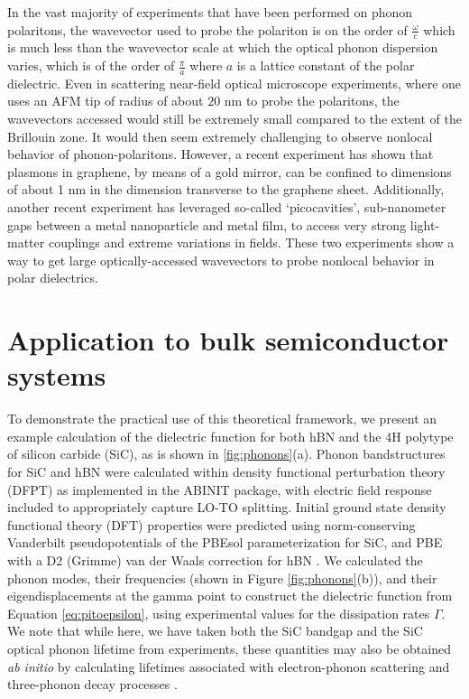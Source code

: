 \documentclass[aps,prb,twocolumn,
	groupedaddress,superscriptaddress,
	amsfonts,amssymb,amsmath,floatfix,
	citeautoscript]{revtex4-1}
\begin{document}
In the vast majority of experiments that have been performed on phonon polaritons, the wavevector used to probe the polariton is on the order of $\frac{\omega}{c}$ which is much less than the wavevector scale at which the optical phonon dispersion varies, which is of the order of $\frac{\pi}{a}$ where $a$ is a lattice constant of the polar dielectric.  Even in scattering near-field optical microscope experiments, where one uses an AFM tip of radius of about $20$ nm to probe the polaritons, the wavevectors accessed would still be extremely small compared to the extent of the Brillouin zone. It would then seem extremely challenging to observe nonlocal behavior of phonon-polaritons. However, a recent experiment \cite{iranzo2018probing} has shown that plasmons in graphene, by means of a gold mirror, can be confined to dimensions of about 1 nm in the dimension transverse to the graphene sheet. Additionally, another recent experiment \cite{benz2016single} has leveraged so-called `picocavities', sub-nanometer gaps between a metal nanoparticle and metal film, to access very strong light-matter couplings and extreme variations in fields. These two experiments show a way to get large optically-accessed wavevectors to probe nonlocal behavior in polar dielectrics.


\section{Application to bulk semiconductor systems}
To demonstrate the practical use of this theoretical framework, we present an example calculation of the dielectric function for both hBN and the 4H polytype of silicon carbide (SiC), as is shown in \ref{fig:phonons}(a). 
Phonon bandstructures for SiC and hBN were calculated within density functional perturbation
theory (DFPT) as implemented in the ABINIT package\cite{abinit1,abinit2,abinit3,Gonze1997dynamical,Hamann2005metric}, with electric field response included to appropriately capture LO-TO splitting. Initial ground state density functional theory (DFT) properties were predicted using norm-conserving Vanderbilt pseudopotentials of the PBEsol parameterization for SiC, and PBE with a D2 (Grimme) van der Waals correction for hBN \cite{PBEsol,PBE,ONCV_PPs,pseudodojo,grimme}. We calculated the phonon modes, their frequencies (shown in Figure \ref{fig:phonons}(b)), and their eigendisplacements at the gamma point to construct the dielectric function from Equation \ref{eq:pitoepsilon}, using experimental values for the dissipation rates $\Gamma$. We note that while here, we have taken both the SiC bandgap and the SiC optical phonon lifetime from experiments, these quantities may also be obtained \emph{ab initio} by calculating lifetimes associated with electron-phonon scattering \cite{sundararaman2014theoretical,brown2015nonradiative,brown2016ab,narang2017effects} and three-phonon decay processes \cite{srivastava1990physics}. 
\end{document}
